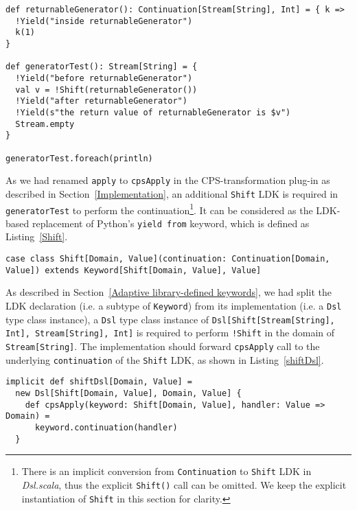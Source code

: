 \begin{lstlisting}[caption={Returning an additional value in LDK-based generators},label={returnableGenerator}]
def returnableGenerator(): Continuation[Stream[String], Int] = { k =>
  !Yield("inside returnableGenerator")
  k(1)
}

def generatorTest(): Stream[String] = {
  !Yield("before returnableGenerator")
  val v = !Shift(returnableGenerator())
  !Yield("after returnableGenerator")
  !Yield(s"the return value of returnableGenerator is $v")
  Stream.empty
}

generatorTest.foreach(println)
\end{lstlisting}

As we had renamed \lstinline{apply} to \lstinline{cpsApply} in the CPS-transformation plug-in as described in Section~\ref{Implementation},  an additional \lstinline{Shift} LDK is required in \lstinline{generatorTest} to perform the continuation\footnote{There is an implicit conversion from \lstinline{Continuation} to \lstinline{Shift} LDK in \textit{Dsl.scala}, thus the explicit \lstinline{Shift()} call can be omitted. We keep the explicit instantiation of \lstinline{Shift} in this section for clarity.}. It can be considered as the LDK-based replacement of Python's \lstinline{yield from} keyword, which is defined as Listing~\ref{Shift}.

\begin{lstlisting}[caption={The definition of \lstinline{Shift} LDK},label={Shift}]
case class Shift[Domain, Value](continuation: Continuation[Domain, Value]) extends Keyword[Shift[Domain, Value], Value]
\end{lstlisting}

As described in Section~\ref{Adaptive library-defined keywords}, we had split the LDK declaration (i.e. a subtype of \lstinline{Keyword}) from its implementation (i.e. a \lstinline{Dsl} type class instance), a \lstinline{Dsl} type class instance of \lstinline{Dsl[Shift[Stream[String], Int], Stream[String], Int]} is required to perform \lstinline{!Shift} in the domain of \lstinline{Stream[String]}. The implementation should forward \lstinline{cpsApply} call to the underlying \lstinline{continuation} of the \lstinline{Shift} LDK, as shown in Listing~\ref{shiftDsl}.

\begin{lstlisting}[caption={The \lstinline{Dsl} instance of \lstinline{Shift} LDK, to forward \lstinline{cpsApply} to underlying \lstinline{continuation}},label={shiftDsl}]
implicit def shiftDsl[Domain, Value] =
  new Dsl[Shift[Domain, Value], Domain, Value] {
    def cpsApply(keyword: Shift[Domain, Value], handler: Value => Domain) =
      keyword.continuation(handler)
  }
\end{lstlisting}

